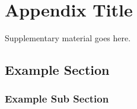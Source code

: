 \appendix

\chapter{Appendix Title}


Supplementary material goes here. 


\section{Example Section}

\subsection{Example Sub Section}





